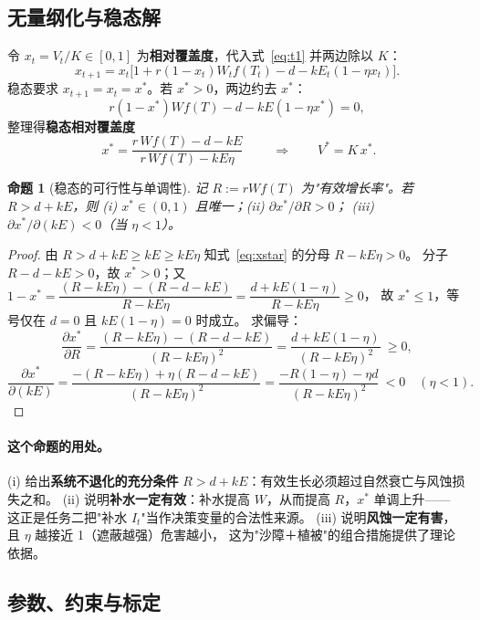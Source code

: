 \documentclass[11pt,a4paper]{ctexart}
\newtheorem{proposition}{命题}
\begin{document}
\subsection{无量纲化与稳态解}

令 $x_t=V_t/K\in[0,1]$ 为\textbf{相对覆盖度}，代入式~\eqref{eq:t1} 并两边除以 $K$：
\begin{equation}\label{eq:x}
x_{t+1}=x_t\Big[1+r(1-x_t)W_tf(T_t)-d-kE_t(1-\eta x_t)\Big].
\end{equation}
稳态要求 $x_{t+1}=x_t=x^*$。若 $x^*>0$，两边约去 $x^*$：
\begin{equation}\label{eq:steady0}
r(1-x^*)Wf(T)-d-kE(1-\eta x^*)=0,
\end{equation}
整理得\textbf{稳态相对覆盖度}
\begin{equation}\label{eq:xstar}
\boxed{\;x^*=\frac{r\,Wf(T)-d-kE}{r\,Wf(T)-kE\eta}\;}
\qquad\Longrightarrow\qquad
V^*=K\,x^*.
\end{equation}

\begin{proposition}[稳态的可行性与单调性]\label{prop:steady}
记 $R:=rWf(T)$ 为"有效增长率"。若 $R>d+kE$，则
(i) $x^*\in(0,1)$ 且唯一；(ii) $\partial x^*/\partial R>0$；
(iii) $\partial x^*/\partial(kE)<0$（当 $\eta<1$）。
\end{proposition}
\begin{proof}
由 $R>d+kE\ge kE\ge kE\eta$ 知式~\eqref{eq:xstar} 的分母 $R-kE\eta>0$。
分子 $R-d-kE>0$，故 $x^*>0$；又
$1-x^*=\dfrac{(R-kE\eta)-(R-d-kE)}{R-kE\eta}=\dfrac{d+kE(1-\eta)}{R-kE\eta}\ge0$，
故 $x^*\le1$，等号仅在 $d=0$ 且 $kE(1-\eta)=0$ 时成立。
求偏导：
\[
\frac{\partial x^*}{\partial R}=\frac{(R-kE\eta)-(R-d-kE)}{(R-kE\eta)^2}
=\frac{d+kE(1-\eta)}{(R-kE\eta)^2}\ \ge 0,
\]
\[
\frac{\partial x^*}{\partial(kE)}
=\frac{-(R-kE\eta)+\eta(R-d-kE)}{(R-kE\eta)^2}
=\frac{-R(1-\eta)-\eta d}{(R-kE\eta)^2}\ <0\quad(\eta<1).
\]
\end{proof}

\paragraph{这个命题的用处。}
(i) 给出\textbf{系统不退化的充分条件} $R>d+kE$：有效生长必须超过自然衰亡与风蚀损失之和。
(ii) 说明\textbf{补水一定有效}：补水提高 $W$，从而提高 $R$，$x^*$ 单调上升——
这正是任务二把"补水 $I_t$"当作决策变量的合法性来源。
(iii) 说明\textbf{风蚀一定有害}，且 $\eta$ 越接近 1（遮蔽越强）危害越小，
这为"沙障＋植被"的组合措施提供了理论依据。

\subsection{参数、约束与标定}
\end{document}
